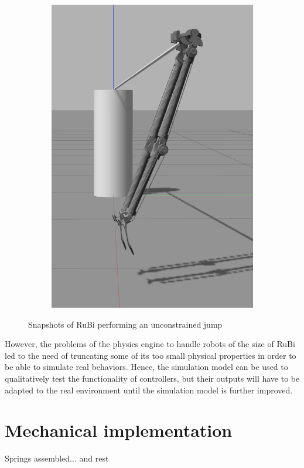 \begin{figure}[ht!]
\begin{subfigure}[b]{0.16\textwidth}
        \includegraphics[width=\textwidth]{figures/gazebo_jumping_7}
    \end{subfigure}
    \caption{Snapshots of RuBi performing an unconstrained jump}
    \label{fig:RuBi_jump_sequence}
\end{figure}      

However, the problems of the physics engine to handle robots of the size of RuBi led to the need of truncating some of its too small physical properties in order to be able to simulate real behaviors.
Hence, the simulation model can be used to qualitatively test the functionality of controllers, but their outputs will have to be adapted to the real environment until the simulation model is further improved.

\section{Mechanical implementation} %
\label{sec:mechanical_implementation}
Springs assembled... and rest

